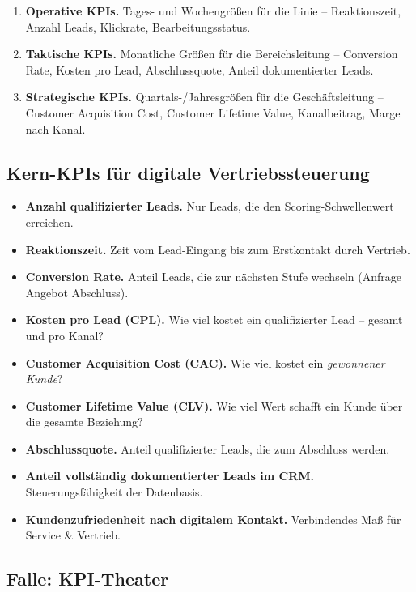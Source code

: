 \documentclass[11pt,a4paper,oneside]{article}
\newcommand{\fachbegriff}[1]{\textbf{#1}}
\begin{document}
\begin{enumerate}
  \item \textbf{Operative KPIs.} Tages- und Wochengrößen für die Linie -- Reaktionszeit, Anzahl Leads, Klickrate, Bearbeitungsstatus.
  \item \textbf{Taktische KPIs.} Monatliche Größen für die Bereichsleitung -- Conversion Rate, Kosten pro Lead, Abschlussquote, Anteil dokumentierter Leads.
  \item \textbf{Strategische KPIs.} Quartals-/Jahresgrößen für die Geschäftsleitung -- Customer Acquisition Cost, Customer Lifetime Value, Kanalbeitrag, Marge nach Kanal.
\end{enumerate}

\subsection{Kern-KPIs für digitale Vertriebssteuerung}

\begin{itemize}
  \item \fachbegriff{Anzahl qualifizierter Leads.} Nur Leads, die den Scoring-Schwellenwert erreichen.
  \item \fachbegriff{Reaktionszeit.} Zeit vom Lead-Eingang bis zum Erstkontakt durch Vertrieb.
  \item \fachbegriff{Conversion Rate.} Anteil Leads, die zur nächsten Stufe wechseln (Anfrage \textrightarrow{} Angebot \textrightarrow{} Abschluss).
  \item \fachbegriff{Kosten pro Lead (CPL).} Wie viel kostet ein qualifizierter Lead -- gesamt und pro Kanal?
  \item \fachbegriff{Customer Acquisition Cost (CAC).} Wie viel kostet ein \emph{gewonnener Kunde}?
  \item \fachbegriff{Customer Lifetime Value (CLV).} Wie viel Wert schafft ein Kunde über die gesamte Beziehung?
  \item \fachbegriff{Abschlussquote.} Anteil qualifizierter Leads, die zum Abschluss werden.
  \item \fachbegriff{Anteil vollständig dokumentierter Leads im CRM.} Steuerungsfähigkeit der Datenbasis.
  \item \fachbegriff{Kundenzufriedenheit nach digitalem Kontakt.} Verbindendes Maß für Service \& Vertrieb.
\end{itemize}

\subsection{Falle: KPI-Theater}
\end{document}
